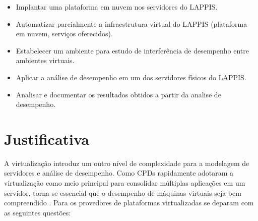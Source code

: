 \begin{itemize}
\item Implantar uma plataforma em nuvem nos servidores do LAPPIS.
\item Automatizar parcialmente a infraestrutura virtual do LAPPIS (plataforma em nuvem, serviços oferecidos).
\item Estabelecer um ambiente para estudo de interferência de desempenho entre ambientes virtuais.
\item Aplicar a análise de desempenho em um dos servidores físicos do LAPPIS.
\item Analisar e documentar os resultados obtidos a partir da analise de desempenho.


\end{itemize}

\section{Justificativa}
A virtualização introduz um outro nível de complexidade para a modelagem de servidores e análise de desempenho. Como CPDs rapidamente adotaram a virtualização como meio principal para consolidar múltiplas aplicações em um servidor, torna-se essencial que o desempenho de máquinas virtuais seja bem compreendido \cite{ticko2010}. Para  os provedores de plataformas virtualizadas se deparam com as seguintes questões:

